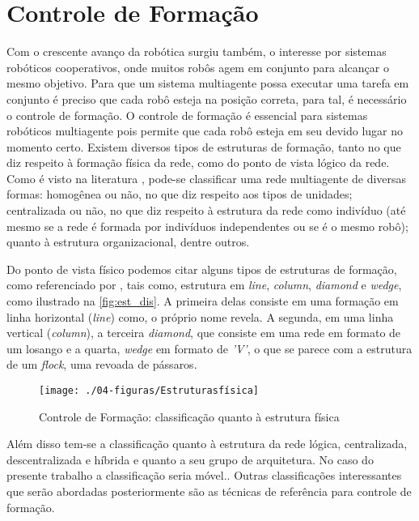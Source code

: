 \section{Controle de Formação}
\label{sec:controleFormacao}
Com o crescente avanço da robótica surgiu também, o interesse por sistemas robóticos cooperativos, onde muitos robôs agem em conjunto para alcançar o mesmo objetivo. Para que um sistema multiagente possa executar uma tarefa em conjunto é preciso que cada robô esteja na posição correta, para tal, é necessário o controle de formação. O controle de formação é essencial para sistemas robóticos multiagente pois permite que cada robô esteja em seu devido lugar no momento certo. Existem diversos tipos de estruturas de formação, tanto no que diz respeito à formação física da rede, como do ponto de vista lógico da rede. Como é visto na literatura \cite{leal2009reconfigurable}, pode-se classificar uma rede multiagente de diversas formas: homogênea ou não, no que diz respeito aos tipos de unidades; centralizada ou não, no que diz respeito à estrutura da rede como indivíduo (até mesmo se a rede é formada por indivíduos independentes ou se é o mesmo robô); quanto à estrutura organizacional, dentre outros. 

Do ponto de vista físico podemos citar alguns tipos de estruturas de formação, como referenciado por , tais como, estrutura em \emph{line}, \emph{column}, \emph{diamond} e \emph{wedge}, como ilustrado na \autoref{fig:est_dis}. A primeira delas consiste em uma formação em linha horizontal (\emph{line}) como, o próprio nome revela. A segunda, em uma linha vertical (\emph{column}), a terceira \emph{diamond}, que consiste em uma rede em formato de um losango e a quarta, \emph{wedge} em formato de \emph{'V'}, o que se parece com a estrutura de um \emph{flock}, uma revoada de pássaros. 

\begin{figure}[!htb]
	\centering
	\texttt{[image: ./04-figuras/Estruturasfísica]}
	\caption{Controle de Formação: classificação quanto à estrutura física}	
	\label{fig:est_fis}
\end{figure}

Além disso tem-se a classificação quanto à estrutura da rede lógica, centralizada, descentralizada e híbrida e quanto a seu grupo de arquitetura. No caso do presente trabalho a classificação seria móvel.\cite{leal2009reconfigurable}. Outras classificações interessantes que serão abordadas posteriormente são as técnicas de referência para controle de formação.

